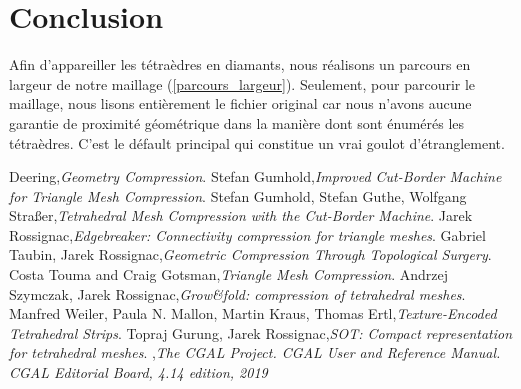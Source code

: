 \documentclass[a4paper,11pt,openany]{article}
\begin{document}
\section{Conclusion}
Afin d'appareiller les tétraèdres en diamants, nous réalisons un parcours en largeur de notre maillage (\ref{parcours_largeur}). Seulement, pour parcourir le maillage, nous lisons entièrement le fichier original car nous n'avons aucune garantie de proximité géométrique dans la manière dont sont énumérés les tétraèdres. C'est le défault principal qui constitue un vrai goulot d'étranglement.

\begin{thebibliography}{999}
Deering,\emph{Geometry Compression}. 
Stefan Gumhold,\emph{Improved Cut-Border Machine for Triangle Mesh Compression}. 
Stefan Gumhold, Stefan Guthe, Wolfgang Straßer,\emph{Tetrahedral Mesh Compression with the Cut-Border Machine}. 
Jarek Rossignac,\emph{Edgebreaker: Connectivity compression for triangle meshes}. 
Gabriel Taubin, Jarek Rossignac,\emph{Geometric Compression Through Topological Surgery}. 
Costa Touma and Craig Gotsman,\emph{Triangle Mesh Compression}. 
Andrzej Szymczak, Jarek Rossignac,\emph{Grow\&fold: compression of tetrahedral meshes}. 
Manfred Weiler, Paula N. Mallon, Martin Kraus, Thomas Ertl,\emph{Texture-Encoded Tetrahedral Strips}. 
Topraj Gurung, Jarek Rossignac,\emph{SOT: Compact representation for tetrahedral meshes}. 
,\emph{The CGAL Project. CGAL User and Reference Manual. CGAL Editorial Board, 4.14 edition, 2019}




\end{thebibliography}
\end{document}
